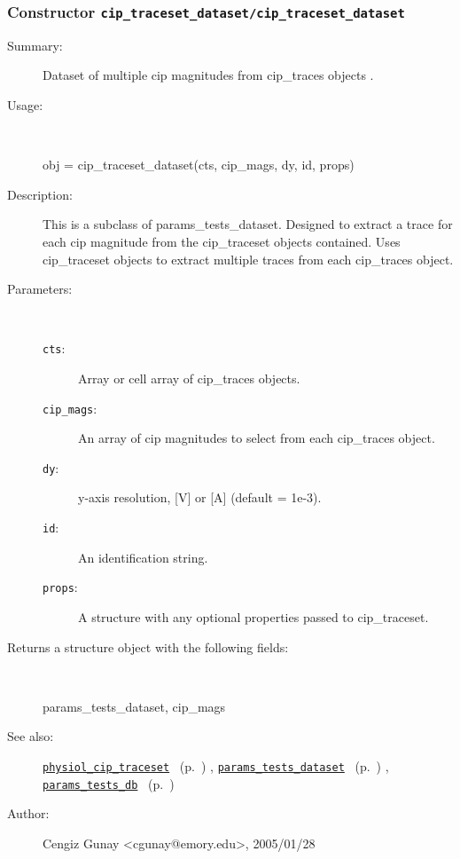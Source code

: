 \subsubsection[Constructor \texttt{cip\_traceset\_dataset}]{Constructor \texttt{cip\_traceset\_dataset/cip\_traceset\_dataset}}%
%
\label{ref_cip_traceset_dataset__cip_traceset_dataset}%
\hypertarget{ref_cip_traceset_dataset__cip_traceset_dataset}{}%
\begin{description}
\item[Summary:]Dataset of multiple cip magnitudes from cip\_traces objects .
%
\item[Usage:]~%
\begin{lyxcode}%
obj = cip\_traceset\_dataset(cts, cip\_mags, dy, id, props)
%
\end{lyxcode}%
%
\item[Description:]%
This is a subclass of params\_tests\_dataset. Designed to extract a trace
 for each cip magnitude from the cip\_traceset objects contained. Uses cip\_traceset
 objects to extract multiple traces from each cip\_traces object.
\item[Parameters:]~
\begin{description}%
\item[\texttt{cts}:]
 Array or cell array of cip\_traces objects.
\item[\texttt{cip\_mags}:]
 An array of cip magnitudes to select from each cip\_traces object.
\item[\texttt{dy}:]
 y-axis resolution, [V] or [A] (default = 1e-3).
\item[\texttt{id}:]
 An identification string.
\item[\texttt{props}:]
 A structure with any optional properties passed to cip\_traceset.
\end{description}%
%
\item[Returns a structure object with the following fields:
]~

	params\_tests\_dataset, cip\_mags
%
%
\item[See also:]%
\hyperlink{ref_physiol_cip_traceset}{\texttt{physiol\_cip\_traceset}}%
\ (p.~\pageref{ref_physiol_cip_traceset})%
%
, \hyperlink{ref_params_tests_dataset}{\texttt{params\_tests\_dataset}}%
\ (p.~\pageref{ref_params_tests_dataset})%
%
, \hyperlink{ref_params_tests_db}{\texttt{params\_tests\_db}}%
\ (p.~\pageref{ref_params_tests_db})%
%
%
\item[Author:]%
Cengiz Gunay <cgunay@emory.edu>, 2005/01/28
%
\end{description}
\methodline%
